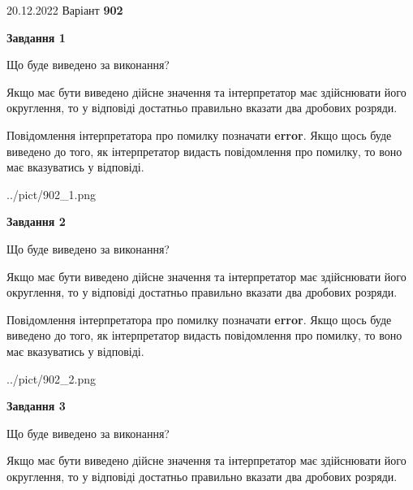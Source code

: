 \documentclass[12pt, ukrainian]{article}
\begin{document}
{20.12.2022 Варіант \No \textbf { 902 }\par}
{
\begin {Large}

{\begin {center}\textbf{Завдання 1}\end {center}}\par
Що буде виведено за виконання? \par

Якщо має бути виведено дійсне значення та інтерпретатор має здійснювати його округлення, 
то у відповіді достатньо правильно вказати два дробових розряди.

Повідомлення інтерпретатора про помилку позначати \textbf{error}.
Якщо щось буде виведено до того, як інтерпретатор видасть повідомлення про помилку, 
то воно має вказуватись у відповіді. \par

\begin{center}
	{../pict/902_1.png}
\end{center}
\newpage

{\begin {center}\textbf{Завдання 2}\end {center}}\par
Що буде виведено за виконання? \par

Якщо має бути виведено дійсне значення та інтерпретатор має здійснювати його округлення, 
то у відповіді достатньо правильно вказати два дробових розряди.

Повідомлення інтерпретатора про помилку позначати \textbf{error}.
Якщо щось буде виведено до того, як інтерпретатор видасть повідомлення про помилку, 
то воно має вказуватись у відповіді. \par

\begin{center}
	{../pict/902_2.png}
\end{center}
\newpage

{\begin {center}\textbf{Завдання 3}\end {center}}\par
Що буде виведено за виконання? \par

Якщо має бути виведено дійсне значення та інтерпретатор має здійснювати його округлення, 
то у відповіді достатньо правильно вказати два дробових розряди.


\end{Large}}
\end{document}
